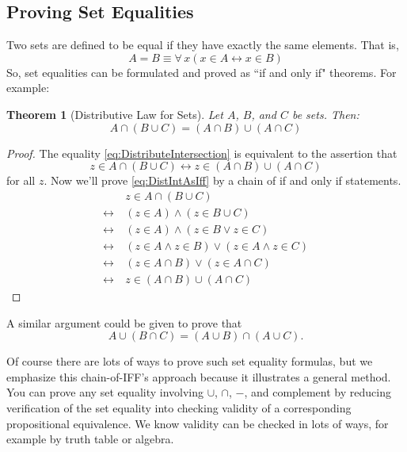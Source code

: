 \documentclass[11pt,oneside]{book}
\newtheorem{thm}{Theorem}[section]
\theoremstyle{definition}
\begin{document}
\subsection{Proving Set Equalities}
Two sets are defined to be equal if they have exactly the same elements.
That is,
\[ A = B \equiv \forall\, x(x \in A \leftrightarrow x \in B) \]
So, set equalities can be formulated and proved as ``if and only if" theorems.
For example:
\begin{thm}[Distributive Law for Sets]
    Let $A$, $B$, and $C$ be sets.
    Then:
    \begin{equation} A \cap (B \cup C) = (A \cap B) \cup (A \cap C) \label{eq:DistributeIntersection}\end{equation}
\end{thm}
\begin{proof}
    The equality \eqref{eq:DistributeIntersection} is equivalent to the assertion that
    \begin{equation} z \in A \cap (B \cup C) \leftrightarrow z \in (A \cap B) \cup (A \cap C) \label{eq:DistIntAsIff}\end{equation}
    for all $z$.
    Now we'll prove \eqref{eq:DistIntAsIff} by a chain of if and only if statements.
    \begin{align}
        &\ z \in A \cap (B \cup C) \tag{given} \\
        \leftrightarrow&\ (z \in A) \land (z \in B \cup C) \tag{def of $\cap$} \\
        \leftrightarrow&\ (z \in A) \land (z \in B \lor z \in C) \tag{def of $\cup$} \\
        \leftrightarrow&\ (z \in A \land z \in B) \lor (z \in A \land z \in C) \tag{Distribution Law} \\
        \leftrightarrow&\ (z \in A \cap B) \lor (z \in A \cap C) \tag{def of $\cap$} \\
        \leftrightarrow&\ z \in (A \cap B) \cup (A \cap C) \tag{def of $\cup$}
    \end{align}
\end{proof}

A similar argument could be given to prove that
\[ A \cup (B \cap C) = (A \cup B) \cap (A \cup C). \]

Of course there are lots of ways to prove such set equality formulas, but we emphasize this chain-of-IFF's approach because it illustrates a general method.
You can prove any set equality involving $\cup$, $\cap$, $-$, and complement by reducing verification of the set equality into checking validity of a corresponding propositional equivalence.
We know validity can be checked in lots of ways, for example by truth table or algebra.
\end{document}
